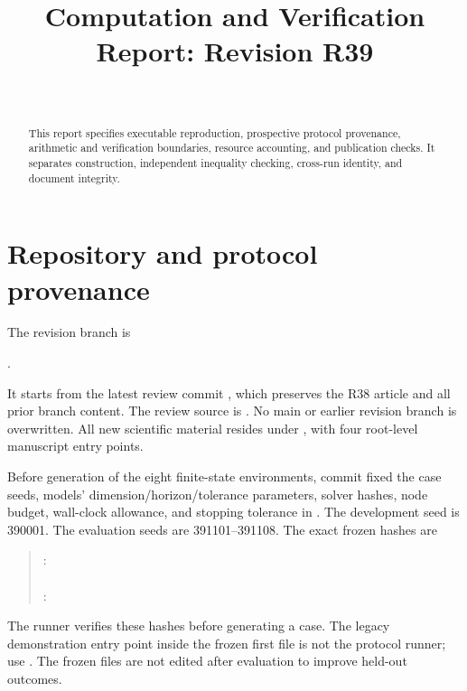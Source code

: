 


\begin{frontmatter}
\title{Computation and Verification Report: Revision R39}
\begin{aug}\author[id=au1,addressref={add1}]{~}\address[id=add1]{}\end{aug}
\begin{abstract}This report specifies executable reproduction, prospective protocol provenance, arithmetic and verification boundaries, resource accounting, and publication checks. It separates construction, independent inequality checking, cross-run identity, and document integrity.\end{abstract}
\end{frontmatter}

\section{Repository and protocol provenance}
The revision branch is
\begin{center}.\end{center}
It starts from the latest review commit , which preserves the R38 article and all prior branch content. The review source is . No main or earlier revision branch is overwritten. All new scientific material resides under , with four root-level manuscript entry points.

Before generation of the eight finite-state environments, commit  fixed the case seeds, models' dimension/horizon/tolerance parameters, solver hashes, node budget, wall-clock allowance, and stopping tolerance in . The development seed is 390001. The evaluation seeds are 391101--391108. The exact frozen hashes are
\begin{quote}\small
{}:\\
\\
:\\
\end{quote}
The runner verifies these hashes before generating a case. The legacy demonstration entry point inside the frozen first file is not the protocol runner; use . The frozen files are not edited after evaluation to improve held-out outcomes.

